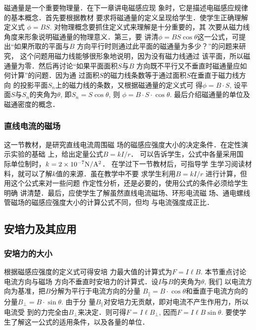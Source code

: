 磁通量是一个重要物理量．在下一章讲电磁感应现
象时，它是描述电磁感应规律的基本概念．首先要根据教材
要求将磁通量的定义呈现给学生．使学生正确理解定义式
$\phi=BS$. 对物理概念要抓住定义式来理解是十分重要的，其
次要从磁力线角度来形象说明磁通量的物理意义．第三，要
讲清$\phi=BS\cos\theta$这一公式，可提出“如果所取的平面与$B$
方向平行时则通过此平面的磁通量为多少？”的问题来研究，
这个问题用磁力线能够很形象地说明，因为没有磁力线通过
该平面，所以磁通量为零．然后再讨论“如果平面面积$S$与$B$
方向既不平行又不垂直时磁通量应如何计算”的问题．因为通
过面积$S$的磁力线条数等于通过面积$S$在垂直于磁力线方向
的投影平面$S_n$上的磁力线的条数，又根据磁通量的定义式可
得$\phi=B\cdot S$, 设平面$S$与$S_n$的夹角为$\theta$, 即$S_n=S\cos\theta$, 则
$\phi=B\cdot S\cdot\cos\theta$. 最后介绍磁通量的单位及磁通密度的概念．

\subsubsection{直线电流的磁场}

这一节教材，是研究直线电流周围磁
场的磁感应强度大小的决定条件．在定性演示实验的基础
上，给出定量公式$B=kI/r$．
可以告诉学生，公式中各量采用国
际单位制时，$k=2\times 10^{-7}{\rm N/A^2}$．
在学过下一节教材后，可指导学
生学习阅读材料，就可以了解$k$值的来源．虽在教学中不要
求学生利用$B=kI/r$
进行计算，但用这个公式来对一些问题
作定性分析，还是必要的，使用公式的条件必须给学生明确
讲清楚．最后，应使学生了解虽然直线电流磁场、环形电流磁
场、通电螺线管磁场的磁感应强度大小的计算公式不同，但均
与电流强度成正比．

\subsection{安培力及其应用}
\subsubsection{安培力的大小}

根据磁感应强度的定义式可得安培
力最大值的计算式为$F=I\ell B$. 本节重点讨论电流方向与磁场
方向不垂直时安培力的计算式．设$I$与$B$的夹角为$\theta$, 我们
以电流方向为基准，把$B$分解为平行于电流方向的分量
$B_{\parallel}=B\cdot\cos\theta$和垂直于电流方向的分量$B_{\bot}=B\cdot\sin\theta$. 由于分
量$B_{\parallel}$对安培力无贡献，即对电流不产生作用力，所以电流受
到的力完全由$B_{\bot}$来决定．则可得$F=I\ell B_{\bot}$, 因而$F=I\ell B\sin\theta$. 
要使学生了解这一公式的适用条件，以及各量的单位．

